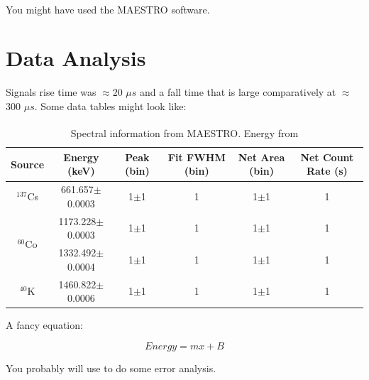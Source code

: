 \documentclass[10pt,letterpaper]{journal}
\begin{document}
You might have used the MAESTRO\textsuperscript{\textregistered} software.

\section{Data Analysis}

Signals rise time was $\approx$20 $\unit{{\mu}s}$ and a fall time that is large comparatively at $\approx$300 $\unit{{\mu}s}$. Some data tables might look like:


\begin{table}[h]
\begin{center}
\small{ 
\begin{tabular}{|c|c|c|c|c|c|}\hline
Source                             & Energy (keV)        & Peak (bin)        & Fit FWHM (bin) & Net Area (bin) & Net Count Rate (s)  \\\hline
\tiny{$^{137}$Cs}                  &  661.657$\pm$0.0003 & 1$\pm$1   & 1 & 1$\pm$1 & 1 \\\hline
\multirow{2}{*}{\tiny{$^{60}$Co}}  & 1173.228$\pm$0.0003 & 1$\pm$1 & 1 &  1$\pm$1 & 1 \\\cline{2-6}
                                   & 1332.492$\pm$0.0004 & 1$\pm$1 & 1 &  1$\pm$1 & 1 \\\hline
\tiny{$^{40}$K}                    & 1460.822$\pm$0.0006 & 1$\pm$1 &  1 &      1$\pm$1 & 1 \\\hline
\end{tabular}
}
\caption{Spectral information from MAESTRO\textsuperscript{\textregistered}. Energy from \cite{bib:nuclear}}
\end{center}
\end{table}

A fancy equation:

\begin{equation}
 Energy= m x + B
\end{equation}


You probably will use \cite{bib:error} to do some error analysis.
\end{document}
